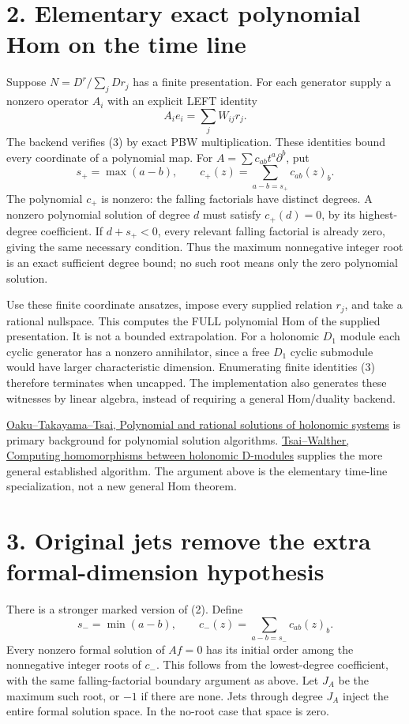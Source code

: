 \documentclass[11pt]{article}
\begin{document}
\section*{2. Elementary exact polynomial Hom on the time line}
Suppose $N=D^r/\sum_j D r_j$ has a finite presentation. For each generator supply a nonzero operator $A_i$ with an explicit LEFT identity
\[
 A_i e_i=\sum_j W_{ij}r_j.                                      \tag{3}
\]
The backend verifies (3) by exact PBW multiplication. These identities bound every coordinate of a polynomial map. For
$A=\sum c_{ab}t^a\partial^b$, put
\[
 s_+=\max(a-b),\qquad
 c_+(z)=\sum_{a-b=s_+}c_{ab}(z)_b .
\]
The polynomial $c_+$ is nonzero: the falling factorials have distinct degrees. A nonzero polynomial solution of degree $d$ must satisfy $c_+(d)=0$, by its highest-degree coefficient. If $d+s_+<0$, every relevant falling factorial is already zero, giving the same necessary condition. Thus the maximum nonnegative integer root is an exact sufficient degree bound; no such root means only the zero polynomial solution.

Use these finite coordinate ansatzes, impose every supplied relation $r_j$, and take a rational nullspace. This computes the FULL polynomial Hom of the supplied presentation. It is not a bounded extrapolation. For a holonomic $D_1$ module each cyclic generator has a nonzero annihilator, since a free $D_1$ cyclic submodule would have larger characteristic dimension. Enumerating finite identities (3) therefore terminates when uncapped. The implementation also generates these witnesses by linear algebra, instead of requiring a general Hom/duality backend.

\href{https://arxiv.org/abs/math/0001064}{Oaku--Takayama--Tsai, Polynomial and rational solutions of holonomic systems} is primary background for polynomial solution algorithms. \href{https://arxiv.org/abs/math/0007139}{Tsai--Walther, Computing homomorphisms between holonomic D-modules} supplies the more general established algorithm. The argument above is the elementary time-line specialization, not a new general Hom theorem.

\section*{3. Original jets remove the extra formal-dimension hypothesis}
There is a stronger marked version of (2). Define
\[
 s_-=\min(a-b),\qquad
 c_-(z)=\sum_{a-b=s_-}c_{ab}(z)_b .
\]
Every nonzero formal solution of $A f=0$ has its initial order among the nonnegative integer roots of $c_-$. This follows from the lowest-degree coefficient, with the same falling-factorial boundary argument as above. Let $J_A$ be the maximum such root, or $-1$ if there are none. Jets through degree $J_A$ inject the entire formal solution space. In the no-root case that space is zero.
\end{document}
